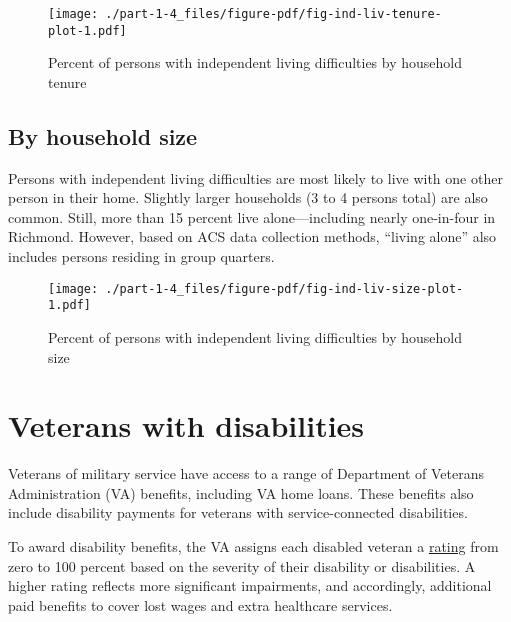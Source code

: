 \documentclass[
  letterpaper,
  DIV=11,
  numbers=noendperiod]{scrreprt}
\begin{document}
\begin{figure}

{\centering \texttt{[image: ./part-1-4\_files/figure-pdf/fig-ind-liv-tenure-plot-1.pdf]}

}

\caption{\label{fig-ind-liv-tenure-plot}Percent of persons with
independent living difficulties by household tenure}

\end{figure}

\hypertarget{by-household-size}{%
\subsection{By household size}\label{by-household-size}}

Persons with independent living difficulties are most likely to live
with one other person in their home. Slightly larger households (3 to 4
persons total) are also common. Still, more than 15 percent live
alone---including nearly one-in-four in Richmond. However, based on ACS
data collection methods, ``living alone'' also includes persons residing
in group quarters.

\begin{figure}

{\centering \texttt{[image: ./part-1-4\_files/figure-pdf/fig-ind-liv-size-plot-1.pdf]}

}

\caption{\label{fig-ind-liv-size-plot}Percent of persons with
independent living difficulties by household size}

\end{figure}

\hypertarget{veterans-with-disabilities}{%
\section{Veterans with disabilities}\label{veterans-with-disabilities}}

Veterans of military service have access to a range of Department of
Veterans Administration (VA) benefits, including VA home loans. These
benefits also include disability payments for veterans with
service-connected disabilities.

To award disability benefits, the VA assigns each disabled veteran a
\href{https://www.va.gov/disability/about-disability-ratings/}{rating}
from zero to 100 percent based on the severity of their disability or
disabilities. A higher rating reflects more significant impairments, and
accordingly, additional paid benefits to cover lost wages and extra
healthcare services.
\end{document}
